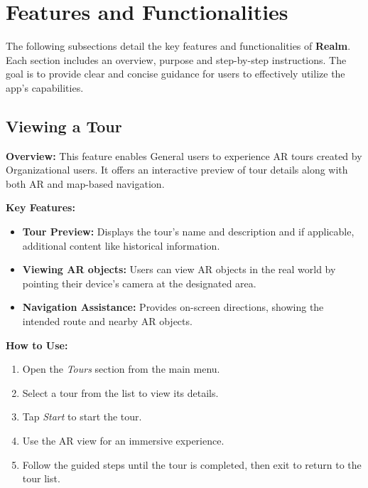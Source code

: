 \documentclass[12pt, titlepage]{article}
\newcommand{\progname}{Realm}
\begin{document}
\section{Features and Functionalities}
The following subsections detail the key features and functionalities of \textbf{\progname{}}. Each section includes an overview, purpose and step-by-step instructions. The goal is to provide clear and concise guidance for users to effectively utilize the app's capabilities.

\subsection{Viewing a Tour}
\textbf{Overview:} This feature enables General users to experience AR tours created by Organizational users. It offers an interactive preview of tour details along with both AR and map-based navigation.

\textbf{Key Features:}
\begin{itemize}[leftmargin=*]
    \item \textbf{Tour Preview:} Displays the tour's name and description and if applicable, additional content like historical information.
    \item \textbf{Viewing AR objects:} Users can view AR objects in the real world by pointing their device's camera at the designated area.
    \item \textbf{Navigation Assistance:} Provides on-screen directions, showing the intended route and nearby AR objects.
\end{itemize}

\textbf{How to Use:}
\begin{enumerate}[leftmargin=*]
    \item Open the \emph{Tours} section from the main menu.
    \item Select a tour from the list to view its details.
    \item Tap \emph{Start} to start the tour.
    \item Use the AR view for an immersive experience.
    \item Follow the guided steps until the tour is completed, then exit to return to the tour list.
\end{enumerate}
\end{document}
